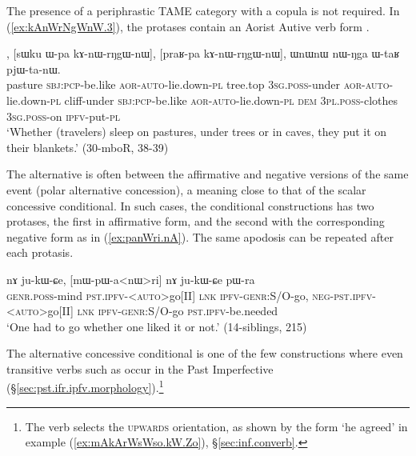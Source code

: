 The presence of a periphrastic TAME category with a copula is not required. In (\ref{ex:kAnWrNgWnW.3}), the protases contain an Aorist Autive verb form .

\begin{exe}
\ex \label{ex:kAnWrNgWnW.3}
, [sɯku ɯ-pa kɤ-nɯ-rŋgɯ-nɯ], [praʁ-pa kɤ-nɯ-rŋgɯ-nɯ], ɯnɯnɯ nɯ-ŋga ɯ-taʁ pjɯ-ta-nɯ. \\
pasture \textsc{sbj}:\textsc{pcp}-be.like \textsc{aor}-\textsc{auto}-lie.down-\textsc{pl} tree.top \textsc{3sg}.\textsc{poss}-under  \textsc{aor}-\textsc{auto}-lie.down-\textsc{pl} cliff-under \textsc{sbj}:\textsc{pcp}-be.like \textsc{aor}-\textsc{auto}-lie.down-\textsc{pl} \textsc{dem} \textsc{3pl}.\textsc{poss}-clothes \textsc{3sg}.\textsc{poss}-on \textsc{ipfv}-put-\textsc{pl} \\
\glt `Whether (travelers) sleep on pastures, under trees or in caves, they put it on their blankets.' (30-mboR, 38-39)
\end{exe} 

The alternative is often between the affirmative and negative versions of the same event (polar alternative concession), a meaning close to that of the scalar concessive conditional. In such cases, the conditional constructions has two protases, the first in affirmative form, and the second with the corresponding negative form as in (\ref{ex:panWri.nA}). The same apodosis can be repeated after each protasis.
 

\begin{exe}
\ex \label{ex:panWri.nA}
\gll [tɯ-sɯm pɯ-a<nɯ>ri] nɤ ju-kɯ-ɕe, [mɯ-pɯ-a<nɯ>ri] nɤ ju-kɯ-ɕe pɯ-ra \\
\textsc{genr}.\textsc{poss}-mind \textsc{pst}.\textsc{ipfv}-<\textsc{auto}>go[II] \textsc{lnk} \textsc{ipfv}-\textsc{genr}:S/O-go, \textsc{neg}-\textsc{pst}.\textsc{ipfv}-<\textsc{auto}>go[II] \textsc{lnk} \textsc{ipfv}-\textsc{genr}:S/O-go \textsc{pst}.\textsc{ipfv}-be.needed \\
\glt `One had to go whether one liked it or not.' (14-siblings, 215)
\end{exe} 
 
The alternative concessive conditional is one of the few constructions where even transitive verbs such as  occur in the Past Imperfective (§\ref{sec:pst.ifr.ipfv.morphology}).\footnote{The verb  selects the \textsc{upwards} orientation, as shown by the form  `he agreed' in example (\ref{ex:mAkArWsWso.kW.Zo}), §\ref{sec:inf.converb}. } 

